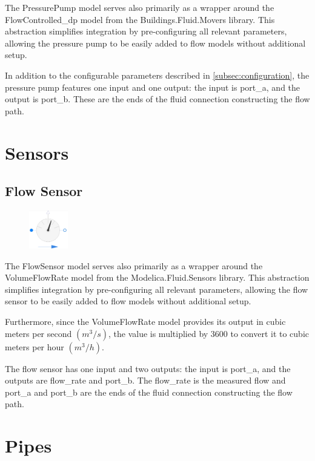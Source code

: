 \documentclass[we,final,11pt,oneside,openany]{uantwerpenbamathesis}
\begin{document}
The PressurePump model serves also primarily as a wrapper around the FlowControlled\_dp model from the Buildings.Fluid.Movers library.
This abstraction simplifies integration by pre-configuring all relevant parameters, allowing the pressure pump to be easily added to flow models without additional setup.

In addition to the configurable parameters described in \autoref{subsec:configuration}, the pressure pump features one input and one output: the input is port\_a, and the output is port\_b.
These are the ends of the fluid connection constructing the flow path.


\section{Sensors}
\label{sec:sensors}

\subsection{Flow Sensor}
\label{subsec:flow-sensor}

\begin{figure}
    \centering
    \includegraphics[width=0.15\textwidth]{Images/components/flow-sensor}
\end{figure}

The FlowSensor model serves also primarily as a wrapper around the VolumeFlowRate model from the Modelica.Fluid.Sensors library.
This abstraction simplifies integration by pre-configuring all relevant parameters, allowing the flow sensor to be easily added to flow models without additional setup.

Furthermore, since the VolumeFlowRate model provides its output in cubic meters per second $(m^{3}/s)$, the value is multiplied by 3600 to convert it to cubic meters per hour $(m^3 /h)$.

The flow sensor has one input and two outputs: the input is port\_a, and the outputs are flow\_rate and port\_b.
The flow\_rate is the measured flow and port\_a and port\_b are the ends of the fluid connection constructing the flow path.

\section{Pipes}
\label{sec:pipes}
\end{document}
